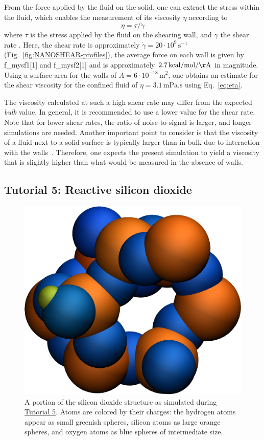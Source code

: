 \documentclass[9pt,tutorial]{livecoms}
\newcommand{\lmpcmd}[1]{\hspace{0pt}\colorbox{listing}{\textcolor{command}{\small{#1}}}\hspace{0pt}} %
\begin{document}
From the force applied by the fluid on the solid, one can extract the stress
within the fluid, which enables the measurement of its viscosity $\eta$
according to
\begin{equation}
\eta = \tau / \dot{\gamma}
\label{eq:eta}
\end{equation}
where $\tau$ is the stress applied by
the fluid on the shearing wall, and $\dot{\gamma}$ the shear rate
\cite{gravelle2021violations}.  Here, the shear rate is
approximately $\dot{\gamma} = 20 \cdot 10^9\,\text{s}^{-1}$ (Fig.~\ref{fig:NANOSHEAR-profiles}),
the average force on each wall is given by \lmpcmd{f\_mysf1[1]} and \lmpcmd{f\_mysf2[1]}
and is approximately $2.7\,\mathrm{kcal/mol/\AA{}}$ in magnitude.  Using a surface area
for the walls of $A = 6 \cdot 10^{-18}\,\text{m}^2$, one obtains an estimate for
the shear viscosity for the confined fluid of $\eta = 3.1\,\text{mPa.s}$ using Eq.~\eqref{eq:eta}.

\begin{note}
The viscosity calculated at such a high shear rate may differ from the expected
\emph{bulk} value.  In general, it is recommended to use a lower value for the
shear rate.  Note that for lower shear rates, the ratio of noise-to-signal is
larger, and longer simulations are needed.  Another important point to consider
is that the viscosity of a fluid next to a solid surface is typically larger
than in bulk due to interaction with the walls~\cite{wolde-kidanInterplayInterfacialViscosity2021}.
Therefore, one expects the present simulation to yield a viscosity that is slightly
higher than what would be measured in the absence of walls.
\end{note}

\subsection{Tutorial 5: Reactive silicon dioxide}
\label{reactive-silicon-dioxide-label}

\begin{figure}
\centering
\includegraphics[width=0.55\linewidth]{SIO}
\caption{A portion of the silicon dioxide structure as simulated during
\hyperref[reactive-silicon-dioxide-label]{Tutorial 5}.  Atoms are colored
by their charges: the hydrogen atoms appear as small greenish spheres, silicon
atoms as large orange spheres, and oxygen atoms as blue spheres of intermediate
size.}
\label{fig:SIO}
\end{figure}
\end{document}
